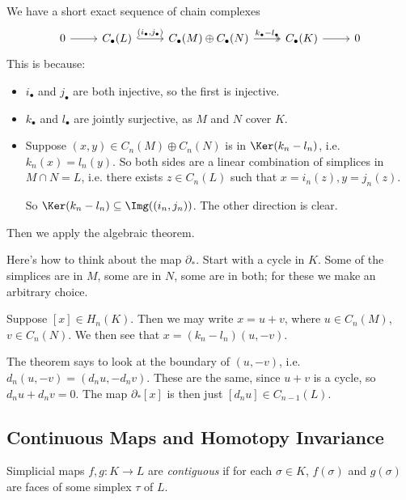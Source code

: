 \documentclass[12pt]{article}
\begin{document}
\begin{proofbox}
	We have a short exact sequence of chain complexes
	\begin{equation*}
		\begin{tikzcd}
			0  \arrow[r] & C_\bullet(L) \arrow[r, "{(i_\bullet, j_\bullet)}", hook] & C_\bullet(M) \oplus C_\bullet(N) \arrow[r, "k_\bullet - l_\bullet", two heads] & C_\bullet(K) \arrow[r] & 0
		\end{tikzcd}
	\end{equation*}
	This is because:
	\begin{itemize}
		\item $i_\bullet$ and $j_\bullet$ are both injective, so the first is injective.
		\item $k_\bullet$ and $l_\bullet$ are jointly surjective, as $M$ and $N$ cover $K$.
		\item Suppose $(x, y) \in C_n(M) \oplus C_n(N)$ is in $\Ker(k_n - l_n)$, i.e. $k_n(x) = l_n(y)$. So both sides are a linear combination of simplices in $M \cap N = L$, i.e. there exists $z \in C_n(L)$ such that $x = i_n(z), y = j_n(z)$.

			So $\Ker(k_n - l_n) \subseteq \Img ((i_n, j_n))$. The other direction is clear.
	\end{itemize}
	Then we apply the algebraic theorem.
\end{proofbox}

Here's how to think about the map $\partial_\ast$. Start with a cycle in $K$. Some of the simplices are in $M$, some are in $N$, some are in both; for these we make an arbitrary choice.

Suppose $[x] \in H_n(K)$. Then we may write $x = u + v$, where $u \in C_n(M)$, $v \in C_n(N)$. We then see that $x = (k_n - l_n)(u, -v)$.

The theorem says to look at the boundary of $(u, -v)$, i.e. $d_n(u, -v) = (d_n u, -d_n v)$. These are the same, since $u + v$ is a cycle, so $d_n u + d_n v = 0$. The map $\partial_\ast[x]$ is then just $[d_nu] \in C_{n-1}(L)$.

\subsection{Continuous Maps and Homotopy Invariance}%
\label{sub:cont_map_hom_inv}

\begin{definition}
	Simplicial maps $f, g : K \to L$ are \emph{contiguous} if for each $\sigma \in K$, $f(\sigma)$ and $g(\sigma)$ are faces of some simplex $\tau$ of $L$.
\end{definition}
\end{document}
